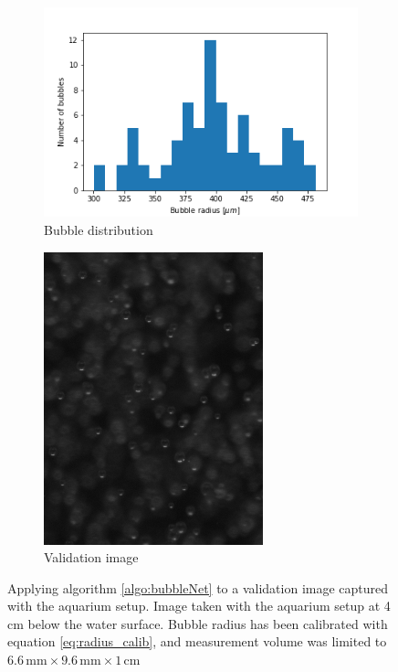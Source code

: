 				\begin{figure}
					\begin{subfigure}[t]{.4\textwidth}
						\includegraphics[scale=0.6]{graphs/b_val_0.png}
						\caption{Bubble distribution}
						\label{subfig:b_val_0}
					\end{subfigure}\hfill
					\begin{subfigure}[t]{.4\textwidth}
						\includegraphics[scale=0.6]{images/val_1.png}
						\caption{Validation image}
						\label{subfig:val_0}
					\end{subfigure}
					\caption{Applying algorithm \ref{algo:bubbleNet} to a validation image captured with the aquarium setup. Image taken with the aquarium setup at 4\,cm below the water surface. Bubble radius has been calibrated with equation \ref{eq:radius_calib}, and measurement volume was limited to $6.6\, \text{mm} \times 9.6 \, \text{mm} \times 1\, \text{cm}$}
					\label{bubb_dist_1}
				\end{figure}




